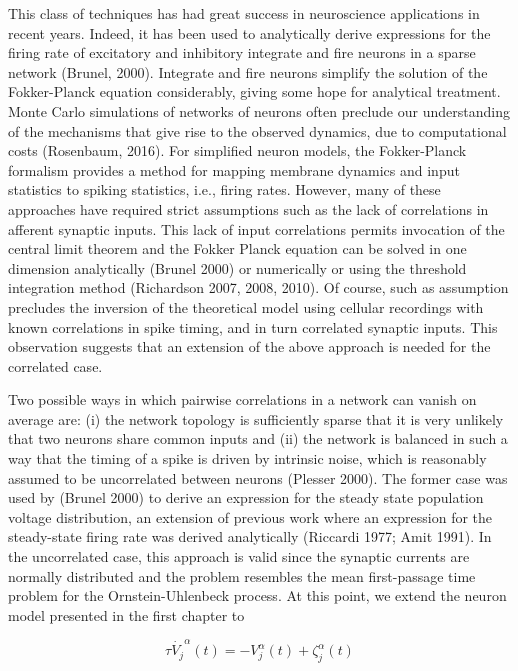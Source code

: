 \documentclass{ucetd}
\begin{document}
This class of techniques has had great success in neuroscience applications in recent years. Indeed, it has been used to analytically derive expressions for the firing rate of excitatory and inhibitory integrate and fire neurons in a sparse network (Brunel, 2000). Integrate and fire neurons simplify the solution of the Fokker-Planck equation considerably, giving some hope for analytical treatment. Monte Carlo simulations of networks of neurons often preclude our understanding of the mechanisms that give rise to the observed dynamics, due to computational costs (Rosenbaum, 2016). For simplified neuron models, the Fokker-Planck formalism provides a method for mapping membrane dynamics and input statistics to spiking statistics, i.e., firing rates. However, many of these approaches have required strict assumptions such as the lack of correlations in afferent synaptic inputs. This lack of input correlations permits invocation of the central limit theorem and the Fokker Planck equation can be solved in one dimension analytically (Brunel 2000) or numerically or using the threshold integration method (Richardson 2007, 2008, 2010). Of course, such as assumption precludes the inversion of the theoretical model using cellular recordings with known correlations in spike timing, and in turn correlated synaptic inputs. This observation suggests that an extension of the above approach is needed for the correlated case.

Two possible ways in which pairwise correlations in a network can vanish on average are: (i) the network topology is sufficiently sparse that it is very unlikely that two neurons share common inputs and (ii) the network is balanced in such a way that the timing of a spike is driven by intrinsic noise, which is reasonably assumed to be uncorrelated between neurons (Plesser 2000). The former case was used by (Brunel 2000) to derive an expression for the steady state population voltage distribution, an extension of previous work where an expression for the steady-state firing rate was derived analytically (Riccardi 1977; Amit 1991). In the uncorrelated case, this approach is valid since the synaptic currents are normally distributed and the problem resembles the mean first-passage time problem for the Ornstein-Uhlenbeck process. At this point, we extend the neuron model presented in the first chapter to 

\begin{equation}
\tau\dot{V_{j}}^{\alpha}(t) = -V_{j}^{\alpha}(t) + \zeta_{j}^{\alpha}(t)
\end{equation}
\end{document}
